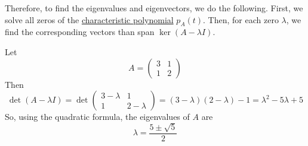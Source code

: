 	Therefore, to find the eigenvalues and eigenvectors, we do the following. First, we solve all zeros of the \hyperref[def:characteristic-polynomial]{characteristic polynomial} $p_A (t)$. Then, for each zero $\lambda$, we find the corresponding vectors than span $\ker(A - \lambda I)$. 

	\begin{example}
	  \label{ex:distinct-eigenvalues}
	  Let 
		\begin{equation}
			A = \begin{pmatrix} 3 & 1 \\ 1 & 2 \end{pmatrix}
		\end{equation}
		Then 
		\begin{equation}
			\det(A - \lambda I) = \det \begin{pmatrix} 3 - \lambda & 1 \\ 1 & 2 - \lambda \end{pmatrix} = (3 - \lambda)(2 - \lambda) - 1 = \lambda^2 - 5 \lambda + 5
		\end{equation}
		So, using the quadratic formula, the eigenvalues of $A$ are 
		\begin{equation}
			\lambda = \frac{5 \pm \sqrt{5}}{2}
		\end{equation}
	\end{example}

